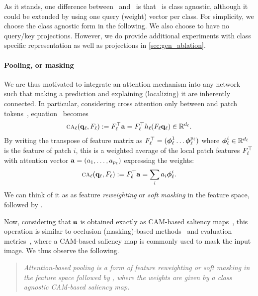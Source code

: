 As it stands, one difference between~ and~ is that~ is class agnostic, although it could be extended by using one query (weight) vector per class. For simplicity, we choose the class agnostic form in the following. We also choose to have no query/key projections. However, we do provide additional experiments with class specific representation as well as projections in \autoref{sec:gen_ablation}. 

\paragraph{Pooling, or masking}

We are thus motivated to integrate an attention mechanism into any network such that making a prediction and explaining (localizing) it are inherently connected. In particular, considering cross attention only between \cls and patch tokens~, equation~ becomes
\begin{align}
	{\textsc{ca}}_\ell(\mathbf{q}_\ell, F_\ell) \mathrel{:=} F_\ell^\top \mathbf{a} = F_\ell^\top h_\ell(F_\ell \mathbf{q}_\ell) \in \mathbb{R}^{d_\ell}.
\label{eq:CA}
\end{align}
By writing the transpose of feature matrix as $F_\ell^\top = ({\boldsymbol{\phi}}_\ell^1 \dots {\boldsymbol{\phi}}_\ell^{p_\ell})$ where ${\boldsymbol{\phi}}_\ell^i \in \mathbb{R}^{d_\ell}$ is the feature of patch $i$, this is a weighted average of the local patch features $F_\ell^\top$ with attention vector $\mathbf{a} = (a_1, \dots, a_{p_\ell})$ expressing the weights:
\begin{align}
	{\textsc{ca}}_\ell(\mathbf{q}_\ell, F_\ell) \mathrel{:=} F_\ell^\top \mathbf{a} = \sum_i a_i {\boldsymbol{\phi}}_\ell^i.
\label{eq:CA-gap}
\end{align}
We can think of it as as feature \emph{reweighting} or \emph{soft masking} in the feature space, followed by \gap.

Now, considering that $\mathbf{a}$ is obtained exactly as CAM-based saliency maps~, this operation is similar to occlusion (masking)-based methods~\citep{petsiuk2018rise, fong2017interpretable, fong2019understanding, schulz2020restricting, ribeiro2016should,DBLP:journals/corr/abs-1910-01279, zhang2023opti} and evaluation metrics~\cite{DBLP:journals/corr/abs-1710-11063, petsiuk2018rise}, where a CAM-based saliency map is commonly used to mask the input image. We thus observe the following.

\begin{quote}
	\emph{Attention-based pooling is a form of feature reweighting or soft masking in the feature space followed by \gap, where the weights are given by a class agnostic CAM-based saliency map.}
\end{quote}


